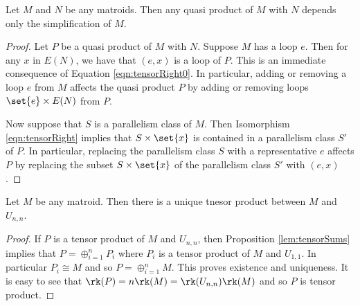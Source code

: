     \begin{lemma}\label{lem:tensorSimplification}
    Let $M$ and $N$ be any matroids. Then any quasi product of $M$ with $N$ depends only the simplification of $M$. 
    \end{lemma}
    \begin{proof}
        Let $P$ be a quasi product of $M$ with $N$. Suppose $M$ has a loop $e$. Then for any $x$ in $E(N)$, we have that $(e,x)$ is a loop of $P$. This is an immediate consequence of Equation \ref{eqn:tensorRight0}. In particular, adding or removing a loop $e$ from $M$ affects the quasi product $P$ by adding or removing loops $\set{e}\times E(N)$ from $P$. 

        Now suppose that $S$ is a parallelism class of $M$. Then Isomorphism \ref{eqn:tensorRight} implies that $S\times \set{x}$ is contained in a parallelism class $S'$ of $P$. In particular, replacing the parallelism class $S$ with a representative $e$ affects $P$ by replacing the subset $S\times \set{x}$ of the parallelism class $S'$ with $(e,x)$. 
    \end{proof}
\begin{proposition}\label{prop:uniqueTensors}
Let $M$ be any matroid. Then there is a unique tnesor product between $M$ and $U_{n,n}$.
\end{proposition}
    \begin{proof}
            If $P$ is a tensor product of $M$ and $U_{n,n}$, then Proposition \ref{lem:tensorSums} implies that $P = \oplus_{i=1}^n P_i$ where $P_i$ is a tensor product of $M$ and $U_{1,1}$. In particular $P_i\cong M$ and so $P=\oplus_{i=1}^n M$. This proves existence and uniqueness. It is easy to see that $\rk(P)=n\rk(M)=\rk(U_{n,n})\rk(M)$ and so $P$ is tensor product.
    \end{proof}
